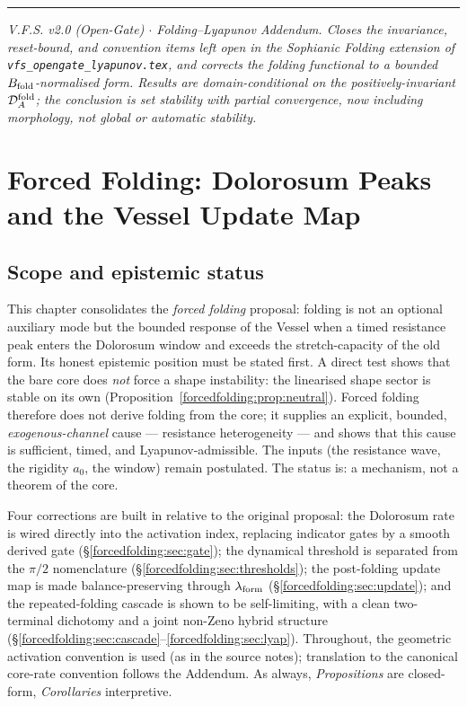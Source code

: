 \documentclass[11pt,a4paper,oneside]{book}
\newcommand{\lf}{\lambda_{\rm form}}
\newcommand{\DAf}{\mathcal D_A^{\rm fold}}
\newcommand{\Bf}{B_{\rm fold}}
\theoremstyle{plain}
\theoremstyle{definition}
\theoremstyle{remark}
\begin{document}
\vspace{0.4em}
\hrule
\smallskip
\noindent\footnotesize\emph{V.F.S. v2.0 (Open-Gate) $\cdot$ Folding--Lyapunov Addendum. Closes the
invariance, reset-bound, and convention items left open in the Sophianic Folding extension of
\texttt{vfs\_opengate\_lyapunov.tex}, and corrects the folding functional to a bounded $\Bf$-normalised
form. Results are domain-conditional on the positively-invariant $\DAf$; the conclusion is set stability
with partial convergence, now including morphology, not global or automatic stability.}

\chapter{Forced Folding: Dolorosum Peaks and the Vessel Update Map}

\section*{Scope and epistemic status}
This chapter consolidates the \emph{forced folding} proposal: folding is not an optional auxiliary mode
but the bounded response of the Vessel when a timed resistance peak enters the Dolorosum window and
exceeds the stretch-capacity of the old form. Its honest epistemic position must be stated first. A
direct test shows that the bare core does \emph{not} force a shape instability: the linearised shape
sector is stable on its own (Proposition~\ref{forcedfolding:prop:neutral}). Forced folding therefore does not derive
folding from the core; it supplies an explicit, bounded, \emph{exogenous-channel} cause --- resistance
heterogeneity --- and shows that this cause is sufficient, timed, and Lyapunov-admissible. The inputs
(the resistance wave, the rigidity $a_0$, the window) remain postulated. The status is: a mechanism, not
a theorem of the core.

Four corrections are built in relative to the original proposal: the Dolorosum rate is wired directly
into the activation index, replacing indicator gates by a smooth derived gate (\S\ref{forcedfolding:sec:gate}); the
dynamical threshold is separated from the $\pi/2$ nomenclature (\S\ref{forcedfolding:sec:thresholds}); the post-folding
update map is made balance-preserving through $\lf$ (\S\ref{forcedfolding:sec:update}); and the repeated-folding
cascade is shown to be self-limiting, with a clean two-terminal dichotomy and a joint non-Zeno hybrid
structure (\S\ref{forcedfolding:sec:cascade}--\ref{forcedfolding:sec:lyap}). Throughout, the geometric activation convention is used
(as in the source notes); translation to the canonical core-rate convention follows the Addendum. As
always, \emph{Propositions} are closed-form, \emph{Corollaries} interpretive.
\end{document}
